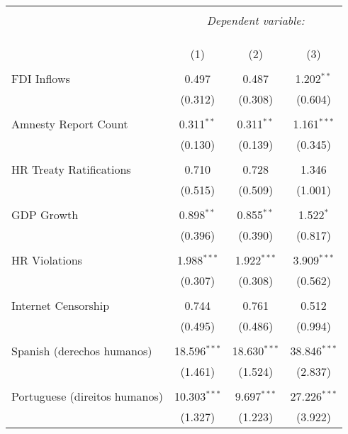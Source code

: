 
\begin{table}[!htbp] \centering 
  \caption{} 
  \label{} 
\begin{tabular}{@{\extracolsep{5pt}}lccc} 
\\[-1.8ex]\hline 
\hline \\[-1.8ex] 
 & \multicolumn{3}{c}{\textit{Dependent variable:}} \\ 
\cline{2-4} 
\\[-1.8ex] & \multicolumn{3}{c}{ } \\ 
\\[-1.8ex] & (1) & (2) & (3)\\ 
\hline \\[-1.8ex] 
 FDI Inflows & 0.497 & 0.487 & 1.202$^{**}$ \\ 
  & (0.312) & (0.308) & (0.604) \\ 
  & & & \\ 
 Amnesty Report Count & 0.311$^{**}$ & 0.311$^{**}$ & 1.161$^{***}$ \\ 
  & (0.130) & (0.139) & (0.345) \\ 
  & & & \\ 
 HR Treaty Ratifications & 0.710 & 0.728 & 1.346 \\ 
  & (0.515) & (0.509) & (1.001) \\ 
  & & & \\ 
 GDP Growth & 0.898$^{**}$ & 0.855$^{**}$ & 1.522$^{*}$ \\ 
  & (0.396) & (0.390) & (0.817) \\ 
  & & & \\ 
 HR Violations & 1.988$^{***}$ & 1.922$^{***}$ & 3.909$^{***}$ \\ 
  & (0.307) & (0.308) & (0.562) \\ 
  & & & \\ 
 Internet Censorship & 0.744 & 0.761 & 0.512 \\ 
  & (0.495) & (0.486) & (0.994) \\ 
  & & & \\ 
 Spanish (derechos humanos) & 18.596$^{***}$ & 18.630$^{***}$ & 38.846$^{***}$ \\ 
  & (1.461) & (1.524) & (2.837) \\ 
  & & & \\ 
 Portuguese (direitos humanos) & 10.303$^{***}$ & 9.697$^{***}$ & 27.226$^{***}$ \\ 
  & (1.327) & (1.223) & (3.922) \\ 

\end{tabular}
\end{table}

